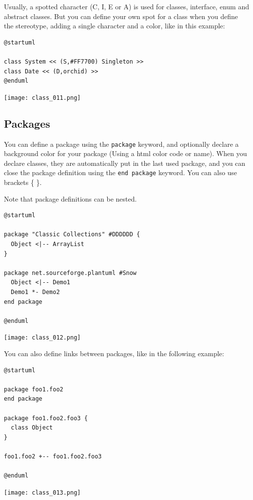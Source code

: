 Usually, a spotted character (C, I, E or A) is used for classes, interface, enum and abstract classes.
But you can define your own spot for a class when you define the stereotype, adding a single character
and a color, like in this example:

\begin{lstlisting}
@startuml

class System << (S,#FF7700) Singleton >>
class Date << (D,orchid) >>
@enduml
\end{lstlisting}
\begin{center}
\texttt{[image: class\_011.png]}
\end{center}
		
\newpage \subsection{Packages}

You can define a package using the \texttt{package} keyword, and optionally
declare a background color for your package (Using a html color code or name).
When you declare classes, they are automatically put in the last used package,
and you can close the package definition using the \texttt{end package} keyword.
You can also use brackets \{ \}.

Note that package definitions can be nested.

\begin{lstlisting}
@startuml

package "Classic Collections" #DDDDDD {
  Object <|-- ArrayList
}

package net.sourceforge.plantuml #Snow
  Object <|-- Demo1
  Demo1 *- Demo2
end package

@enduml
\end{lstlisting}
\begin{center}
\texttt{[image: class\_012.png]}
\end{center}
		

You can also define links between packages, like in the following example:
\begin{lstlisting}
@startuml

package foo1.foo2
end package

package foo1.foo2.foo3 {
  class Object
}

foo1.foo2 +-- foo1.foo2.foo3

@enduml
\end{lstlisting}
\begin{center}
\texttt{[image: class\_013.png]}
\end{center}
		
